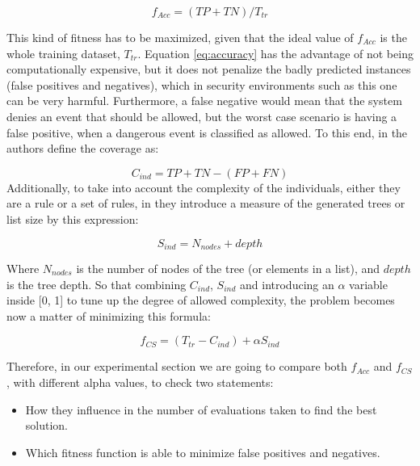 \documentclass[runningheads]{llncs}
\begin{document}
\begin{equation}
\label{eq:accuracy}
f_{Acc} = (TP + TN) / T_{tr}
\end{equation}

This kind of fitness has to be maximized, given that the ideal value
of $f_{Acc}$ is the whole training dataset, $T_{tr}$. Equation \ref{eq:accuracy} has the 
advantage of not being computationally expensive, but it does not
penalize the badly predicted instances (false positives and
negatives), which in security environments such as this one can be
very harmful. Furthermore, a false negative would mean that the system denies an event that should be allowed, but the worst case scenario is having a false positive, when a dangerous event is classified as allowed.
To this end, in \cite{witten2005data} the authors define the coverage as:

\begin{equation}
\label{eq:coverage}
C_{ind} = TP + TN - (FP + FN)
\end{equation}
Additionally, to take into account the complexity of the individuals,
either they are a rule or a set of rules, in \cite{witten2005data}
they introduce a measure of the generated trees or list size by this
expression: 

\begin{equation}
S_{ind} = N_{nodes} + depth
\end{equation}

Where $N_{nodes}$ is the number of nodes of the tree (or elements in a list), and $depth$ is the tree depth. So that combining $C_{ind}$, $S_{ind}$ and introducing an $\alpha$ variable inside [0, 1] to tune up the degree of allowed complexity, the problem becomes now a matter of minimizing this formula:

\begin{equation}
\label{eq:complexFitness}
f_{CS} = (T_{tr} - C_{ind}) + \alpha S_{ind}
\end{equation}

Therefore, in our experimental section we are going to compare both
$f_{Acc}$ and $f_{CS}$, with different  alpha values, to check two statements:

\begin{itemize}
	\item How they influence in the number of evaluations taken to find the best solution.
	\item Which fitness function is able to minimize false
          positives and negatives.
\end{itemize}
\end{document}
